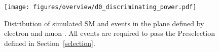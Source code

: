 \begin{figure}[hbtp]
\centering
\texttt{[image: figures/overview/d0\_discriminating\_power.pdf]}
\caption{Distribution of simulated SM and \stoptolb events in the plane defined by electron \ad and muon \ad. All events are required to pass the \Pe\Pgm Preselection defined in Section~\ref{selection}.} 
\label{d0_discriminating_power}
\end{figure}
